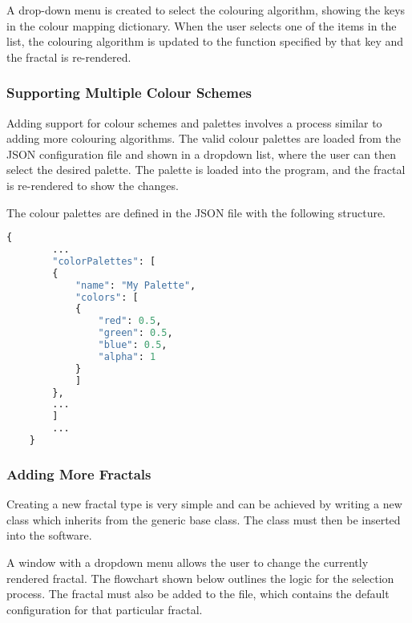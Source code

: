 A drop-down menu is created to select the colouring algorithm, showing the keys in the colour mapping dictionary. When the user selects one of the items in the list, the colouring algorithm is updated to the function specified by that key and the fractal is re-rendered.

\subsubsection{Supporting Multiple Colour Schemes}

Adding support for colour schemes and palettes involves a process similar to adding more colouring algorithms. The valid colour palettes are loaded from the JSON configuration file and shown in a dropdown list, where the user can then select the desired palette. The palette is loaded into the program, and the fractal is re-rendered to show the changes.

\vspace{0.25cm}
\noindent
The colour palettes are defined in the JSON file with the following structure.
\begin{lstlisting}[language=python]
	{
		...
		"colorPalettes": [
		{
			"name": "My Palette",
			"colors": [
			{
				"red": 0.5,
				"green": 0.5,
				"blue": 0.5,
				"alpha": 1
			}
			]
		},
		...
		]
		...
	}
\end{lstlisting}

\subsubsection{Adding More Fractals}

Creating a new fractal type is very simple and can be achieved by writing a new class which inherits from the generic  base class. The class must then be inserted into the software.

A window with a dropdown menu allows the user to change the currently rendered fractal. The flowchart shown below outlines the logic for the selection process. The fractal must also be added to the  file, which contains the default configuration for that particular fractal.


